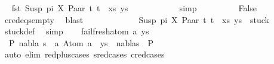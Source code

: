 \begin{isabellebody}
\ \isamarkupfalse%
\ {\isachardoublequoteopen}fst\ {\isacharparenleft}{\kern0pt}{\isacharparenleft}{\kern0pt}Susp\ pi\ X{\isacharcomma}{\kern0pt}\ Paar\ t{}\ t{}{\isacharparenright}{\kern0pt}\ {\isacharhash}{\kern0pt}\ xs{\isacharcomma}{\kern0pt}\ ys{\isacharparenright}{\kern0pt}\ {\isasymnoteq}\ {\isacharbrackleft}{\kern0pt}{\isacharbrackright}{\kern0pt}{\isachardoublequoteclose}\isanewline
\ \ \ \ \ \ \ \ \isamarkupfalse%
\ simp\isanewline
\ \ \ \ \ \ \isamarkupfalse%
\ \isamarkupfalse%
\ False\ \isanewline
\ \ \ \ \ \ \ \ \isamarkupfalse%
\ c{\isacharunderscore}{\kern0pt}red{\isacharunderscore}{\kern0pt}eqs{\isacharunderscore}{\kern0pt}empty\ \isamarkupfalse%
\ blast\isanewline
\ \ \ \ \isamarkupfalse%
\isanewline
\ \ \isamarkupfalse%
\isanewline
\ \ \isamarkupfalse%
\ \isamarkupfalse%
\ {\isachardoublequoteopen}{\isacharparenleft}{\kern0pt}{\isacharparenleft}{\kern0pt}Susp\ pi\ X{\isacharcomma}{\kern0pt}\ Paar\ t{}\ t{}{\isacharparenright}{\kern0pt}\ {\isacharhash}{\kern0pt}\ xs{\isacharcomma}{\kern0pt}\ ys{\isacharparenright}{\kern0pt}\ {\isasymin}\ stuck{\isachardoublequoteclose}\isanewline
\ \ \ \ \isamarkupfalse%
\ stuck{\isacharunderscore}{\kern0pt}def\ \isamarkupfalse%
\ simp\isanewline
{}\isamarkupfalse%
\isanewline
\ \ \isamarkupfalse%
\ {\isacharparenleft}{\kern0pt}fail{\isacharunderscore}{\kern0pt}fresh{\isacharunderscore}{\kern0pt}atom\ a\ ys{\isacharparenright}{\kern0pt}\isanewline
\ \ \isamarkupfalse%
\ {\isachardoublequoteopen}{\isasymnot}\ {\isacharparenleft}{\kern0pt}{\isasymexists}P{}\ nabla\ s{\isachardot}{\kern0pt}\ {\isacharparenleft}{\kern0pt}{\isacharbrackleft}{\kern0pt}{\isacharbrackright}{\kern0pt}{\isacharcomma}{\kern0pt}\ {\isacharparenleft}{\kern0pt}a{\isacharcomma}{\kern0pt}\ Atom\ a{\isacharparenright}{\kern0pt}\ {\isacharhash}{\kern0pt}\ ys{\isacharparenright}{\kern0pt}\ {\isasymTurnstile}\ {\isacharparenleft}{\kern0pt}nabla{\isacharcomma}{\kern0pt}s{\isacharparenright}{\kern0pt}\ {\isasymRightarrow}\ P{}{\isacharparenright}{\kern0pt}{\isachardoublequoteclose}\isanewline
\ \ \ \ \isamarkupfalse%
\ {\isacharparenleft}{\kern0pt}auto\ elim{\isacharcolon}{\kern0pt}\ red{\isacharunderscore}{\kern0pt}plus{\isachardot}{\kern0pt}cases\ s{\isacharunderscore}{\kern0pt}red{\isachardot}{\kern0pt}cases\ c{\isacharunderscore}{\kern0pt}red{\isachardot}{\kern0pt}cases{\isacharparenright}{\kern0pt}\isanewline

\end{isabellebody}
